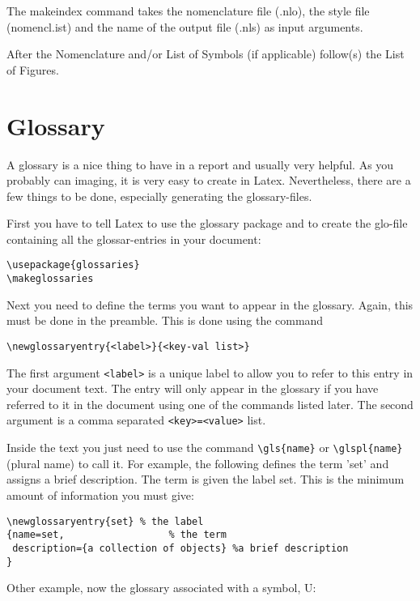 \begin{sloppypar}
The makeindex command takes the nomenclature file (.nlo), the style file (nomencl.ist) and the name of the output file (.nls) as input arguments.
\end{sloppypar}

After the Nomenclature and/or List of Symbols (if applicable) follow(s) the List of Figures. 

\section{Glossary} %
\label{sec:glossary}

A glossary is a nice thing to have in a report and usually very helpful. As you probably can imaging, it is very easy to create in Latex. Nevertheless, there are a few things to be done, especially generating the glossary-files.

First you have to tell Latex to use the glossary package and to create the glo-file containing all the glossar-entries in your document:

\begin{verbatim}
\usepackage{glossaries} 
\makeglossaries
\end{verbatim}

Next you need to define the terms you want to appear in the glossary. Again, this must be done in the preamble. This is done using the command

\verb!\newglossaryentry{<label>}{<key-val list>}! 

The first argument \verb!<label>! is a unique label to allow you to refer to this entry in your document text. The entry will only appear in the glossary if you have referred to it in the document using one of the commands listed later. The second argument is a comma separated \verb!<key>=<value>! list.

Inside the text you just need to use the command \verb!\gls{name}! or \verb!\glspl{name}! (plural name) to call it. For example, the following defines the term 'set' and assigns a brief description. The term is given the label set. This is the minimum amount of information you must give:

\begin{verbatim}
\newglossaryentry{set} % the label
{name=set,            		% the term
 description={a collection of objects} %a brief description
}
 \end{verbatim}

Other example, now the glossary associated with a symbol, \gls{U}:

